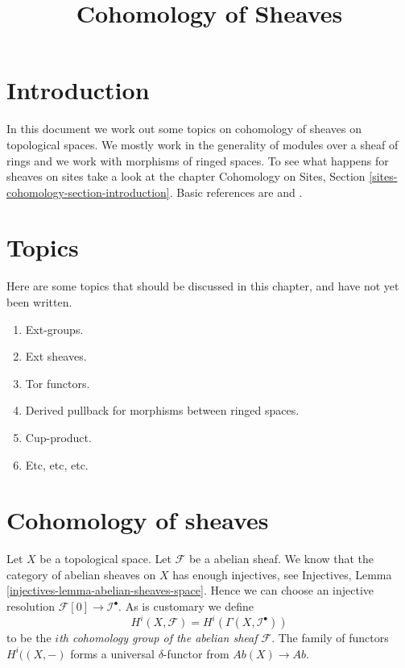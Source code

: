 

%


\title{Cohomology of Sheaves}


\maketitle

\label{section-phantom}

\tableofcontents

\section{Introduction}
\label{section-introduction}

\noindent
In this document we work out some topics on cohomology of sheaves
on topological spaces. We mostly work in the generality of modules
over a sheaf of rings and we work with morphisms of ringed spaces.
To see what happens for sheaves on sites take a look at the chapter
Cohomology on Sites, Section \ref{sites-cohomology-section-introduction}.
Basic references are \cite{Godement} and \cite{Iversen}.


\section{Topics}
\label{section-topics}

\noindent
Here are some topics that should be discussed in this chapter,
and have not yet been written.
\begin{enumerate}
\item Ext-groups.
\item Ext sheaves.
\item Tor functors.
\item Derived pullback for morphisms between ringed spaces.
\item Cup-product.
\item Etc, etc, etc.
\end{enumerate}



\section{Cohomology of sheaves}
\label{section-cohomology-sheaves}

\noindent
Let $X$ be a topological space. Let $\mathcal{F}$ be a abelian sheaf.
We know that the category of abelian sheaves on $X$ has enough injectives, see
Injectives, Lemma \ref{injectives-lemma-abelian-sheaves-space}.
Hence we can choose an injective resolution
$\mathcal{F}[0] \to \mathcal{I}^\bullet$. As is customary we define
\begin{equation}
\label{equation-cohomology}
H^i(X, \mathcal{F}) = H^i(\Gamma(X, \mathcal{I}^\bullet))
\end{equation}
to be the {\it $i$th cohomology group of the abelian sheaf $\mathcal{F}$}.
The family of functors $H^i((X, -)$ forms a universal $\delta$-functor
from $\textit{Ab}(X) \to \textit{Ab}$.

